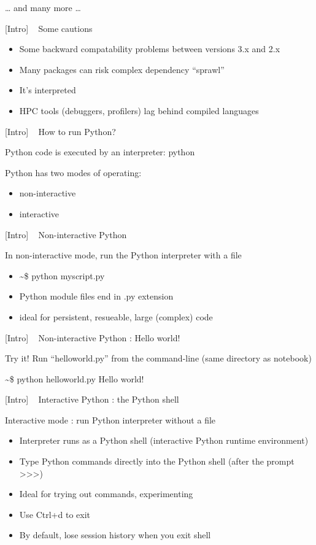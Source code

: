 \documentclass{article}
\begin{document}
\ldots{} and many more \ldots{}

    {[}Intro{]} ~ Some cautions

\begin{itemize}
\item
  Some backward compatability problems between versions 3.x and 2.x
\item
  Many packages can risk complex dependency ``sprawl''
\item
  It's interpreted
\item
  HPC tools (debuggers, profilers) lag behind compiled languages
\end{itemize}

    {[}Intro{]} ~ How to run Python?

Python code is executed by an interpreter: python

Python has two modes of operating:

\begin{itemize}
\itemsep1pt\parskip0pt
\item
  non-interactive
\item
  interactive
\end{itemize}

 

    {[}Intro{]} ~ Non-interactive Python

In non-interactive mode, run the Python interpreter with a file

\begin{itemize}
\itemsep1pt\parskip0pt
\item
   \textasciitilde{}\$ python myscript.py 
\item
  Python module files end in .py extension
\item
  ideal for persistent, resueable, large (complex) code
\end{itemize}

    {[}Intro{]} ~ Non-interactive Python : Hello world!

Try it! Run ``helloworld.py'' from the command-line (same directory as
notebook)

\textasciitilde{}\$ python helloworld.py Hello world!

    {[}Intro{]} ~ Interactive Python : the Python shell

Interactive mode : run Python interpreter without a file

\begin{itemize}
\itemsep1pt\parskip0pt
\item
  Interpreter runs as a Python shell (interactive Python runtime
  environment)
\item
  Type Python commands directly into the Python shell (after the prompt
  \textgreater{}\textgreater{}\textgreater{})
\item
  Ideal for trying out commands, experimenting
\item
  Use Ctrl+d to exit
\item
  By default, lose session history when you exit shell
\end{itemize}
\end{document}
